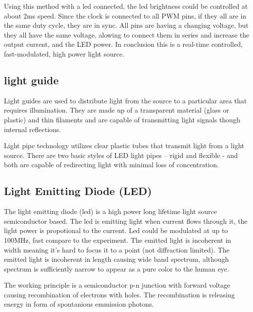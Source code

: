 \documentclass[\main/master.tex]{subfiles}
\begin{document}
\par
Using this method with a led connected, the led brightness could be controlled at about 2ms speed. Since the clock is connected to all PWM pins, if they all are in the same duty cycle, they are in sync. All pins are having a changing voltage, but they all have the same voltage, alowing to connect them in series and increase the output current, and the LED power. In conclusion this is a real-time controlled, fast-modulated, high power light source. 



\subsection{light guide}
\color{blue}
\par
Light guides are used to distribute light from the source to a particular area that requires illumination. They are made up of a transparent material (glass or plastic) and thin filaments and are capable of transmitting light signals though internal reflections.  

Light pipe technology utilizes clear plastic tubes that transmit light from a light source. There are two basic styles of LED light pipes – rigid and flexible - and both are capable of redirecting light with minimal loss of concentration.
\color{black}


\subsection{Light Emitting Diode (LED)}
The light emitting diode (led) is a high power long lifetime light source semiconductor based. The led is emitting light when current flows through it, the light power is propotional to the current. Led could be modulated at up to 100MHz, fast compare to the experiment. The emitted light is incoherent in width meaning it's hard to focus it to a point (not diffraction limited). The emitted light is incoherent in length causing wide band spectrum, although spectrum is sufficiently narrow to appear as a pure color to the human eye.
\par

The working principle is a semiconductor p-n junction with forward voltage causing recombination of electrons with holes. The recombination is releasing energy in form of spontanious emmission photons. 
\par
\color{blue}
\par
\color{black}
\end{document}
